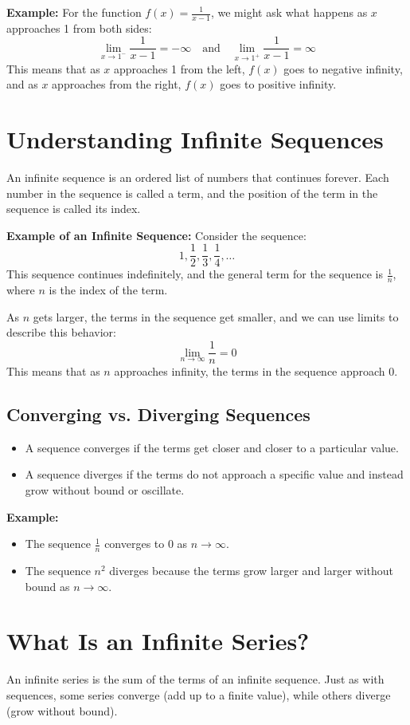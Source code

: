 \textbf{Example:} For the function $f(x) = \frac{1}{x-1}$, we might ask what happens as $x$ approaches 1 from both sides:
\[
\lim_{x \to 1^-} \frac{1}{x-1} = -\infty \quad \text{and} \quad \lim_{x \to 1^+} \frac{1}{x-1} = \infty
\]
This means that as $x$ approaches 1 from the left, $f(x)$ goes to negative infinity, and as $x$ approaches from the right, $f(x)$ goes to positive infinity.

\section{Understanding Infinite Sequences}
An infinite sequence is an ordered list of numbers that continues forever. Each number in the sequence is called a term, and the position of the term in the sequence is called its index.

\textbf{Example of an Infinite Sequence:}
Consider the sequence:
\[
1, \frac{1}{2}, \frac{1}{3}, \frac{1}{4}, \dots
\]
This sequence continues indefinitely, and the general term for the sequence is $\frac{1}{n}$, where $n$ is the index of the term.

As $n$ gets larger, the terms in the sequence get smaller, and we can use limits to describe this behavior:
\[
\lim_{n \to \infty} \frac{1}{n} = 0
\]
This means that as $n$ approaches infinity, the terms in the sequence approach 0.

\subsection{Converging vs. Diverging Sequences}
\begin{itemize}
    \item A sequence converges if the terms get closer and closer to a particular value.
    \item A sequence diverges if the terms do not approach a specific value and instead grow without bound or oscillate.
\end{itemize}

\textbf{Example:}
\begin{itemize}
    \item The sequence $\frac{1}{n}$ converges to 0 as $n \to \infty$.
    \item The sequence $n^2$ diverges because the terms grow larger and larger without bound as $n \to \infty$.
\end{itemize}

\section{What Is an Infinite Series?}
An infinite series is the sum of the terms of an infinite sequence. Just as with sequences, some series converge (add up to a finite value), while others diverge (grow without bound).

